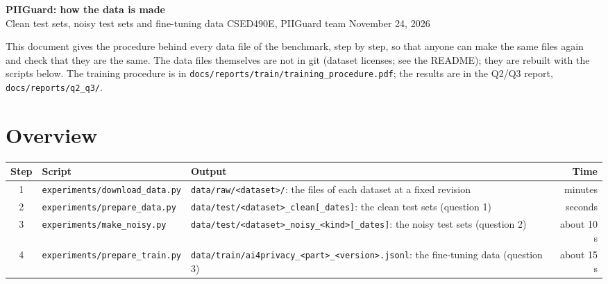 \documentclass[10pt,a4paper]{article}
\newcommand{\file}[1]{\texttt{#1}}
\begin{document}
\begin{center}
{\Large\bfseries PIIGuard: how the data is made}\\[3pt]
{\small Clean test sets, noisy test sets and fine-tuning data \textperiodcentered{} CSED490E, PIIGuard team
\textperiodcentered{} November 24, 2026}
\end{center}

This document gives the procedure behind every data file of the benchmark, step by step, so that
anyone can make the same files again and check that they are the same. The data files themselves
are not in git (dataset licenses; see the README); they are rebuilt with the scripts below. The
training procedure is in \file{docs/reports/train/training\_procedure.pdf}; the results are in
the Q2/Q3 report, \file{docs/reports/q2\_q3/}.

\section{Overview}

\begin{center}
\end{center}

\begin{tabularx}{\linewidth}{@{}clLr@{}}
\toprule
Step & Script & Output & Time \\
 & \file{experiments/download\_data.py} & \file{data/raw/<dataset>/}: the files of each dataset at a fixed revision & minutes \\
2 & \file{experiments/prepare\_data.py} & \file{data/test/<dataset>\_clean[\_dates]}: the clean test sets (question 1) & seconds \\
3 & \file{experiments/make\_noisy.py} & \file{data/test/<dataset>\_noisy\_<kind>[\_dates]}: the noisy test sets (question 2) & about 10 s \\
4 & \file{experiments/prepare\_train.py} & \file{data/train/ai4privacy\_<part>\_<version>.jsonl}: the fine-tuning data (question 3) & about 15 s \\
\bottomrule
\end{tabularx}
\end{document}
